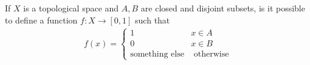 If $X$ is a topological space and $A,B$ are closed and disjoint subsets, is it possible to define a function $f: X \to [0,1]$ such that
\begin{align*}
  f(x) = \left\{\begin{array}{ll}
    1 & x \in A\\
    0 & x \in B\\
    \text{something else} & \text{ otherwise}
  \end{array} \right.
\end{align*}





